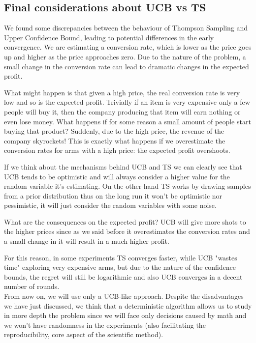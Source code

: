 \documentclass[11pt]{article} %
\begin{document}
\clearpage

{\footnotesize}

\subsection{Final considerations about UCB vs TS}
We found some discrepancies between the behaviour of Thompson Sampling and Upper Confidence Bound, leading to potential differences in the early convergence. We are estimating a conversion rate, which is lower as the price goes up and higher as the price approaches zero. Due to the nature of the problem, a small change in the conversion rate can lead to dramatic changes in the expected profit.

What might happen is that given a high price, the real conversion rate is very low and so is the expected profit. Trivially if an item is very expensive only a few people will buy it, then the company producing that item will earn nothing or even lose money. What happens if for some reason a small amount of people start buying that product? Suddenly, due to the high price, the revenue of the company skyrockets! This is exactly what happens if we overestimate the conversion rates for arms with a high price: the expected profit overshoots.

If we think about the mechanisms behind UCB and TS we can clearly see that UCB tends to be optimistic and will always consider a higher value for the random variable it's estimating. On the other hand TS works by drawing samples from a prior distribution thus on the long run it won't be optimistic nor pessimistic, it will just consider the random variables with some noise.

What are the consequences on the expected profit? UCB will give more shots to the higher prices since as we said before it overestimates the conversion rates and a small change in it will result in a much higher profit.

For this reason, in some experiments TS converges faster, while UCB "wastes time" exploring very expensive arms, but due to the nature of the confidence bounds, the regret will still be logarithmic and also UCB converges in a decent number of rounds.\\

From now on, we will use only a UCB-like approach. Despite the disadvantages we have just discussed, we think that a deterministic algorithm allows us to study in more depth the problem since we will face only decisions caused by math and we won't have randomness in the experiments (also facilitating the reproducibility, core aspect of the scientific method).
\end{document}
